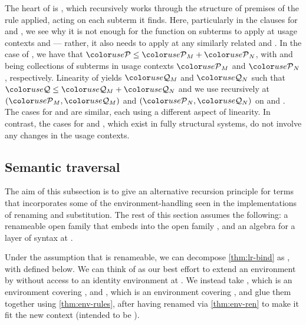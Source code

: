 
The heart of  is , which recursively
works through the structure  of premises of the rule applied,
acting on each subterm it finds.
Here, particularly in the clauses for  and
, we see why it is not enough for the
function on subterms to apply at usage contexts  and 
--- rather, it also needs to apply at any similarly related 
and .
In the case of , we have that
$\grP \leq \grP_M + \grP_N$, with  and  being
collections of subterms in usage contexts $\grP_M$ and $\grP_N$, respectively.
Linearity of  yields $\grQ_M$ and $\grQ_N$ such that
$\grQ \leq \grQ_M + \grQ_N$ and we use  recursively at
$(\grP_M, \grQ_M)$ and $(\grP_N, \grQ_N)$ on  and .
The cases for  and
 are similar, each using a different aspect
of linearity.
In contrast, the cases for  and
, which exist in fully structural
systems, do not involve any changes in the usage contexts.


\subsection{Semantic traversal}

The aim of this subsection is to give an alternative recursion principle for
terms that incorporates some of the environment-handling seen in the
implementations of renaming and substitution.
The rest of this section assumes the following: a renameable open family
\AgdaBound{$\V$} that embeds into the open family \AgdaBound{$\C$}, and an
algebra for a layer of syntax at \AgdaBound{$\C$}.



Under the assumption that \AgdaBound{$\V$} is renameable, we can decompose
\cref{thm:lr-bind} as
\AgdaSpace{}\AgdaOperator{\AgdaFunction{$\circ$}}%
\AgdaSpace{}, with  defined below.
We can think of  as our best effort to extend an
environment by \AgdaBound{$\Theta$} without access to an identity environment
at \AgdaBound{$\Theta$}.
We instead take \AgdaBound{$\rho$}, which is an environment covering
\AgdaBound{$\Delta$}, and \AgdaBound{$\sigma$}, which is an environment
covering \AgdaBound{$\Theta$}, and glue them together using
\cref{thm:env-rules}, after having renamed \AgdaBound{$\rho$} via
\cref{thm:env-ren} to make it fit the new context \AgdaBound{$\Gamma^+$}
(intended to be ).

